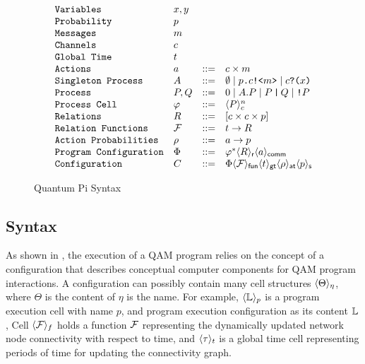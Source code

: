 \begin{figure}[t]
{\small
  \[\begin{array}{llcl} 
      \texttt{Variables} & x,y \\
      \texttt{Probability} & p\\
      \texttt{Messages} & m\\
    \texttt{Channels} & c\\
    \texttt{Global Time} & t\\
    \texttt{Actions} & a & ::= & c \times m\\
      \texttt{Singleton Process} & A & ::= & \emptyset \mid p\texttt{.}c\texttt{!<}m\texttt{>} \mid c\texttt{?(}x\texttt{)} \\
      \texttt{Process} & P,Q & ::= & 0 \mid A.P \mid P\,\texttt{|}\,Q \mid \texttt{!}P \\
      \texttt{Process Cell} & \varphi & ::= & \langle P \rangle^{n}_{c} \\
      \texttt{Relations} & R & ::= & [c \times c \times p] \\
      \texttt{Relation Functions} & \mathcal{F} & ::= & t \to R\\
    \texttt{Action Probabilities} & \rho & ::=& a \to p\\
      \texttt{Program Configuration} & \Phi & ::= & \varphi^* \langle R \rangle_{\textsf{r}}\langle a \rangle_{\textsf{comm}}\\
      \texttt{Configuration} & C & ::= & \Phi\langle \mathcal{F} \rangle_{\textsf{fun}}\langle t \rangle_{\textsf{gt}}\langle \rho \rangle_{\textsf{at}}\langle p \rangle_{\textsf{s}}
    \end{array}
  \]
}
\caption{Quantum Pi Syntax}
  \label{fig:q-pi-syntax}
\end{figure}


\subsection{Syntax} \label{sec:qamsyntax}

As shown in , the execution of a QAM program relies on the concept of 
a configuration that describes conceptual computer components for QAM program interactions.
A configuration can possibly contain many cell structures $\langle \Theta \rangle_{\eta}$, where $\Theta$ is the content of $\eta$ is the name.
For example, $\langle \mathbb{L} \rangle_{p}$ is a program execution cell with name $p$, and program execution configuration as its content $\mathbb{L}$,
Cell $\langle \mathcal{F} \rangle_{f}$ holds a function $\mathcal{F}$ representing the dynamically updated network node connectivity with respect to time, and $\langle \tau \rangle_{t}$ is a global time cell representing periods of time for updating the connectivity graph.

